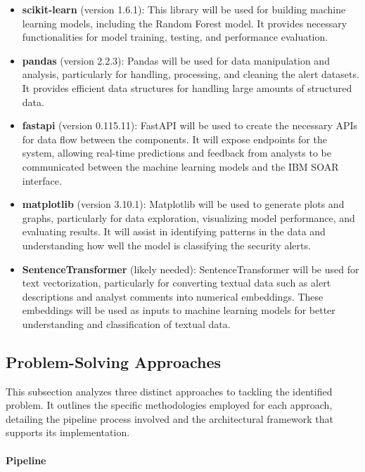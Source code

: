 \begin{itemize}
    \item \textbf{scikit-learn} (version 1.6.1): This library will be used for building machine learning models, including the Random Forest model. It provides necessary functionalities for model training, testing, and performance evaluation.
    
    \item \textbf{pandas} (version 2.2.3): Pandas will be used for data manipulation and analysis, particularly for handling, processing, and cleaning the alert datasets. It provides efficient data structures for handling large amounts of structured data.

    \item \textbf{fastapi} (version 0.115.11): FastAPI will be used to create the necessary APIs for data flow between the components. It will expose endpoints for the system, allowing real-time predictions and feedback from analysts to be communicated between the machine learning models and the IBM SOAR interface.

    \item \textbf{matplotlib} (version 3.10.1): Matplotlib will be used to generate plots and graphs, particularly for data exploration, visualizing model performance, and evaluating results. It will assist in identifying patterns in the data and understanding how well the model is classifying the security alerts.

    \item \textbf{SentenceTransformer} (likely needed): SentenceTransformer will be used for text vectorization, particularly for converting textual data such as alert descriptions and analyst comments into numerical embeddings. These embeddings will be used as inputs to machine learning models for better understanding and classification of textual data.

\end{itemize}


\subsection{Problem-Solving Approaches}
This subsection analyzes three distinct approaches to tackling the identified problem. 
It outlines the specific methodologies employed for each approach, detailing the pipeline process involved and the architectural framework that supports its implementation.

\paragraph{Pipeline}

